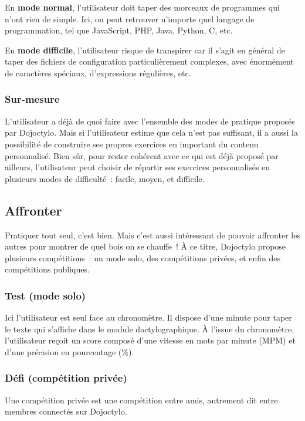 \documentclass[a4paper,12pt]{article}
\begin{document}
En \textbf{mode normal}, l'utilisateur doit taper des morceaux de programmes qui n'ont rien de simple. Ici, on peut retrouver n'importe quel langage de programmation, tel que JavaScript, PHP, Java, Python, C, etc.

En \textbf{mode difficile}, l'utilisateur risque de transpirer car il s'agit en général de taper des fichiers de configuration particulièrement complexes, avec énormément de caractères spéciaux, d'expressions régulières, etc.

\subsubsection{Sur-mesure}

L'utilisateur a déjà de quoi faire avec l'ensemble des modes de pratique proposés par Dojoctylo. Mais si l'utilisateur estime que cela n'est pas suffisant, il a aussi la possibilité de construire ses propres exercices en important du contenu personnalisé. Bien sûr, pour rester cohérent avec ce qui est déjà proposé par ailleurs, l'utilisateur peut choisir de répartir ses exercices personnalisés en plusieurs modes de difficulté~: facile, moyen, et difficile.

\subsection{Affronter}

Pratiquer tout seul, c'est bien. Mais c'est aussi intéressant de pouvoir affronter les autres pour montrer de quel bois on se chauffe~! À ce titre, Dojoctylo propose plusieurs compétitions~: un mode solo, des compétitions privées, et enfin des compétitions publiques.

\subsubsection{Test (mode solo)}

Ici l'utilisateur est seul face au chronomètre. Il dispose d'une minute pour taper le texte qui s'affiche dans le module dactylographique. À l'issue du chronomètre, l'utilisateur reçoit un score composé d'une vitesse en mots par minute (MPM) et d'une précision en pourcentage (\%).

\subsubsection{Défi (compétition privée)}

Une compétition privée est une compétition entre amis, autrement dit entre membres connectés sur Dojoctylo.
\end{document}
